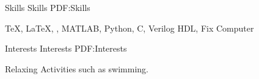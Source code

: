 \documentclass[letterpaper,MMMyyyy,nonstopmode]{simpleresumecv}
\begin{document}
\begin{Body}









\Section
{Skills}
{Skills}
{PDF:Skills}

\Entry
{\TeX}, {\LaTeX}, {\XeLaTeX},
MATLAB,
Python,
C,
Verilog HDL,
Fix Computer




\Section
{Interests}
{Interests}
{PDF:Interests}

\Entry
Relaxing Activities such as swimming.




\end{Body}
\end{document}
